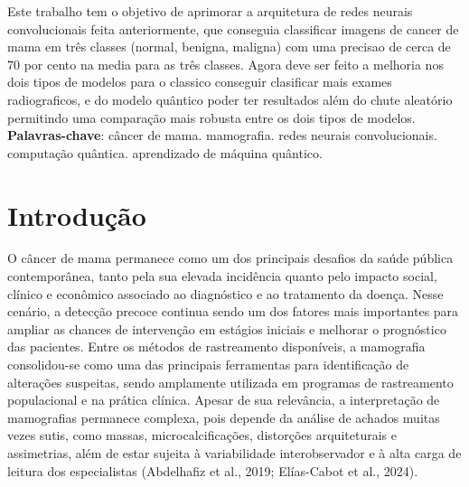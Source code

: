 \documentclass[
    12pt,
    openright,
    oneside,
    a4paper,
    english,
    brazil
]{abntex2}
\begin{document}
\frenchspacing

\pretextual
\imprimircapa
\imprimirfolhaderosto

\begin{resumo}

Este trabalho tem o objetivo de aprimorar a arquitetura de redes neurais convolucionais feita anteriormente, que conseguia classificar imagens de cancer de mama em três classes (normal, benigna, maligna) com uma precisao de cerca de 70 por cento na media para as três classes. Agora deve ser feito a melhoria nos dois tipos de modelos para o classico conseguir clasificar mais exames radiograficos, e do modelo quântico poder ter resultados além do chute aleatório permitindo uma comparação mais robusta entre os dois tipos de modelos. 
\vspace{\onelineskip}
\noindent
\textbf{Palavras-chave}: câncer de mama. mamografia. redes neurais convolucionais. computação quântica. aprendizado de máquina quântico.
\end{resumo}

\tableofcontents*
\cleardoublepage

\textual

\chapter{Introdução}

O câncer de mama permanece como um dos principais desafios da saúde pública contemporânea, tanto pela sua elevada incidência quanto pelo impacto social, clínico e econômico associado ao diagnóstico e ao tratamento da doença. Nesse cenário, a detecção precoce continua sendo um dos fatores mais importantes para ampliar as chances de intervenção em estágios iniciais e melhorar o prognóstico das pacientes. Entre os métodos de rastreamento disponíveis, a mamografia consolidou-se como uma das principais ferramentas para identificação de alterações suspeitas, sendo amplamente utilizada em programas de rastreamento populacional e na prática clínica. Apesar de sua relevância, a interpretação de mamografias permanece complexa, pois depende da análise de achados muitas vezes sutis, como massas, microcalcificações, distorções arquiteturais e assimetrias, além de estar sujeita à variabilidade interobservador e à alta carga de leitura dos especialistas (Abdelhafiz et al., 2019; Elías-Cabot et al., 2024).
\end{document}
